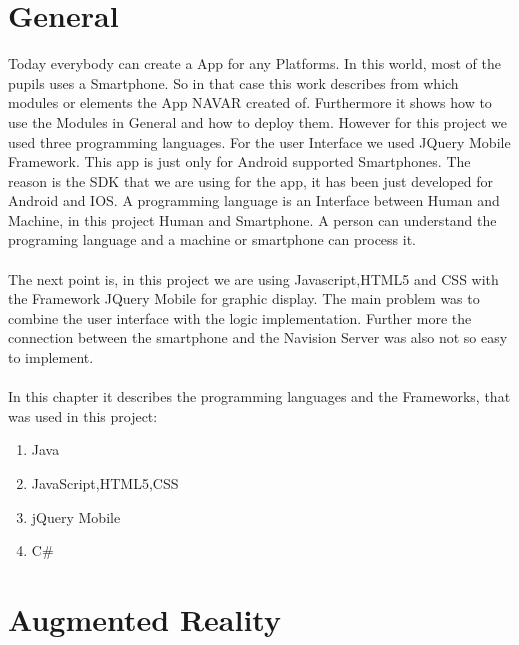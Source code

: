 
\section{General}
Today everybody can create a App for any Platforms. In this world, most of the pupils uses a Smartphone. So in that case this work describes from which modules or elements  the App NAVAR created of.  Furthermore it shows how to use the Modules in General and how to deploy them. However for this project we used three programming languages. For the user Interface we used JQuery Mobile Framework. This app is just only for Android supported Smartphones. The reason is the SDK that  we are using for the app, it has been just developed for Android and IOS.  A programming language is an Interface between Human and Machine, in this project Human and Smartphone. A person can understand the programing language and a machine or smartphone can process it. 
\\\\
The next point is, in this project we are using Javascript,HTML5 and CSS with the Framework JQuery Mobile for graphic display. The main problem was to combine the user interface with the logic implementation. Further more the connection between the smartphone and the Navision Server was also not so easy to implement.
\\\\
In this chapter it describes the programming languages and the Frameworks, that was used in this project:
\begin{enumerate}
\item Java
\item JavaScript,HTML5,CSS
\item jQuery Mobile
\item C\#
\end{enumerate}
\newpage
\section{Augmented Reality}
